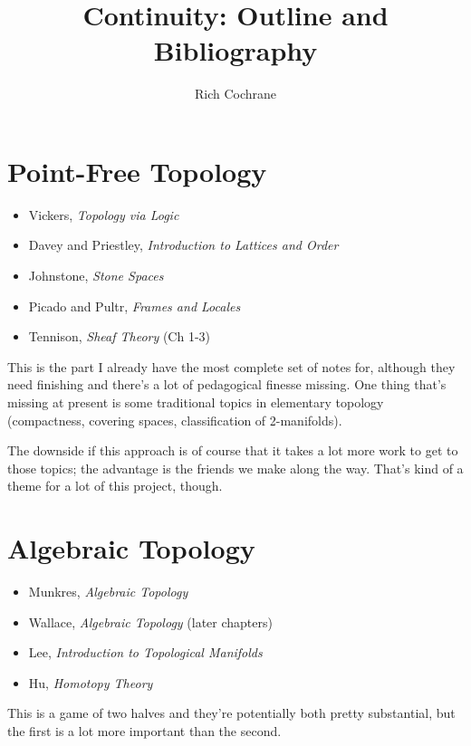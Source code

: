 \documentclass[article]{article}
\begin{document}
\title{Continuity: Outline and Bibliography}
\author{Rich Cochrane}
\maketitle

\section{Point-Free Topology}

\begin{itemize}
	\item{Vickers, \emph{Topology via Logic}}
	\item{Davey and Priestley, \textit{Introduction to Lattices and Order}}
	\item{Johnstone, \emph{Stone Spaces}}
	\item{Picado and Pultr, \emph{Frames and Locales}}
	\item{Tennison, \emph{Sheaf Theory} (Ch 1-3)}
\end{itemize}

This is the part I already have the most complete set of notes for, although they need finishing and there's a lot of pedagogical finesse missing. One thing that's missing at present is some traditional topics in elementary topology (compactness, covering spaces, classification of 2-manifolds). 

The downside if this approach is of course that it takes a lot more work to get to those topics; the advantage is the friends we make along the way. That's kind of a theme for a lot of this project, though.

\section{Algebraic Topology}

\begin{itemize}
	\item{Munkres, \textit{Algebraic Topology}}
	\item{Wallace, \textit{Algebraic Topology} (later chapters)}
	\item{Lee, \textit{Introduction to Topological Manifolds}}
	\item{Hu, \textit{Homotopy Theory}}
\end{itemize}

This is a game of two halves and they're potentially both pretty substantial, but the first is a lot more important than the second. 
\end{document}
